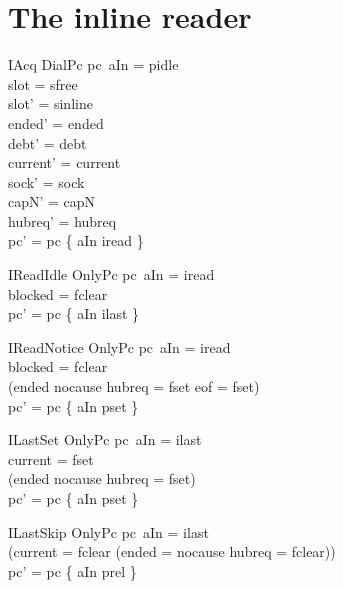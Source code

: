 \documentclass[a4paper,10pt,fleqn]{article}
\begin{document}
\section{The inline reader}

\begin{schema}{IAcq}
  DialPc
\where
  pc~aIn = pidle \\
  slot = sfree \\
  slot' = sinline \\
  ended' = ended \\
  debt' = debt \\
  current' = current \\
  sock' = sock \\
  capN' = capN \\
  hubreq' = hubreq \\
  pc' = pc \oplus \{ aIn \mapsto iread \}
\end{schema}

\begin{schema}{IReadIdle}
  OnlyPc
\where
  pc~aIn = iread \\
  blocked = fclear \\
  pc' = pc \oplus \{ aIn \mapsto ilast \}
\end{schema}

\begin{schema}{IReadNotice}
  OnlyPc
\where
  pc~aIn = iread \\
  blocked = fclear \\
  (ended \neq nocause \lor hubreq = fset \lor eof = fset) \\
  pc' = pc \oplus \{ aIn \mapsto pset \}
\end{schema}

\begin{schema}{ILastSet}
  OnlyPc
\where
  pc~aIn = ilast \\
  current = fset \\
  (ended \neq nocause \lor hubreq = fset) \\
  pc' = pc \oplus \{ aIn \mapsto pset \}
\end{schema}

\begin{schema}{ILastSkip}
  OnlyPc
\where
  pc~aIn = ilast \\
  (current = fclear \lor (ended = nocause \land hubreq = fclear)) \\
  pc' = pc \oplus \{ aIn \mapsto prel \}
\end{schema}
\end{document}
